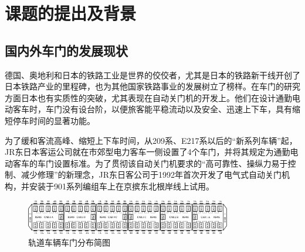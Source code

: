 \section{课题的提出及背景}
\subsection{国内外车门的发展现状}
德国、奥地利和日本的铁路工业是世界的佼佼者，尤其是日本的铁路新干线开创了日本铁路产业的里程碑，也为其他国家铁路事业的发展树立了榜样。在车门的研究方面日本也有实质性的突破，尤其表现在自动关门机的开发上。他们在设计通勤电动客车时，车门没有设台阶，以便旅客能平稳流动以及安全、迅速上下车，具有缩短停车时间的显著功能。

为了缓和客流高峰、缩短上下车时间，从209系、E217系以后的“新系列车辆”起，JR东日本客运公司就在市郊型电力客车一侧设置了4个车门，并将其规定为通勤电动客车的车门设置标准。为了贯彻该自动关门机要求的“高可靠性、操纵力易于控制、减少修理”的新理念，JR东日客公司于1992年首次开发了电气式自动关门机构，并安装于901系列编组车上在京摈东北根岸线上试用。
\begin{figure}[hp]
    \centering
    \includegraphics[width=0.8\textwidth]{figures/train.png}
    \caption{轨道车辆车门分布简图}
    \label{fig:train_railways}
\end{figure}



